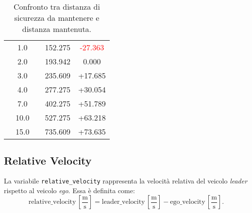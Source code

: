 \begin{table}[h!]
{\begin{tabular}{|c|c|c|c|c|}
                     & 1.0 &  & 152.275 & \textcolor{red}{-27.363} \\
                     & 2.0 &  & 193.942 & 0.000 \\
                     & 3.0 &  & 235.609 & \textcolor[rgb]{0.0,0.5,0.0}{+17.685}   \\
                     & 4.0 &  & 277.275 & \textcolor[rgb]{0.0,0.5,0.0}{+30.054}  \\
                     & 7.0 &  & 402.275 & \textcolor[rgb]{0.0,0.5,0.0}{+51.789}  \\
                     & 10.0 &  & 527.275 & \textcolor[rgb]{0.0,0.5,0.0}{+63.218} \\
                     & 15.0 &  & 735.609 & \textcolor[rgb]{0.0,0.5,0.0}{+73.635} \\
\hline
\end{tabular}
}
\caption{Confronto tra distanza di sicurezza da mantenere e distanza mantenuta.}
\label{tab:d_sicurezza_mantenuta}
\end{table}

\subsection{Relative Velocity}
La variabile \texttt{relative\_velocity} rappresenta la velocità relativa del veicolo \emph{leader} rispetto al veicolo \emph{ego}.
Essa è definita come:
\[
\text{relative\_velocity}\,\left[\frac{\mathrm{m}}{\mathrm{s}}\right] = \text{leader\_velocity}\,\left[\frac{\mathrm{m}}{\mathrm{s}}\right] - \text{ego\_velocity}\,\left[\frac{\mathrm{m}}{\mathrm{s}}\right].
\]
